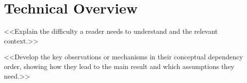 \section{Technical Overview}\label{sec:overview}
<<Explain the difficulty a reader needs to understand and the relevant context.>>

<<Develop the key observations or mechanisms in their conceptual dependency order,
showing how they lead to the main result and which assumptions they need.>>
